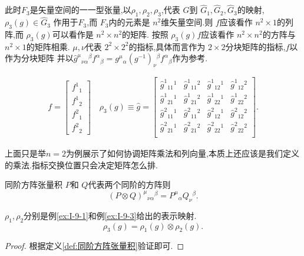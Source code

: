 \documentclass[../main.tex]{subfiles}
\begin{document}
    此时$F_3$是矢量空间的一一型张量,以$\rho_1,\rho_2,\rho_3$,代表 $G$到 $\hat{G}_1,\hat{G}_2,\hat{G}_3$的映射,$\rho_3(g) \in \hat{G}_3$ 作用于$F_3$,而
     $F_3$内的元素是 $n^2$维矢量空间.则 $f$应该看作 $n^2\times 1$的列阵,而 $\rho_3(g)$可以看作是 $n^2 \times n^2$的矩阵.
     按照 $\rho_3(g)f$应该看作 $n^2 \times n^2$的方阵与 $n^2 \times 1$的矩阵相乘.
     $\mu,\nu$代表 $2^2\times 2^2$的指标,具体而言作为 $2\times 2$分块矩阵的指标,$f$以作为分块矩阵
     并以$\hat{g}^{\mu}{}_{\nu \alpha}{}^{\beta} f^{\alpha}{}_{\beta}= g^{\mu}{}_{\alpha}(g^{-1})_{\nu}{}^{\beta} f^{\alpha}{}_{\beta}$作为参考.
      
    \begin{align*}
      f = \begin{bmatrix} f^{1}{}_{1} \\ f^{1}{}_{2}\\f^{2}{}_{1}\\f^{2}{}_{2} \end{bmatrix} 
      \quad \rho_3(g) \equiv \hat{g} = 
      \begin{bmatrix}  
        \hat{g}^{1}{}_{11}{}^1&\hat{g}^{1}{}_{11}{}^2&\hat{g}^{1}{}_{12}{}^1&\hat{g}^{1}{}_{12}{}^2\\
        \hat{g}^{1}{}_{21}{}^1&\hat{g}^{1}{}_{21}{}^2&\hat{g}^{1}{}_{22}{}^1&\hat{g}^{1}{}_{22}{}^2\\
        \hat{g}^{2}{}_{11}{}^1&\hat{g}^{2}{}_{11}{}^2&\hat{g}^{2}{}_{12}{}^1&\hat{g}^{2}{}_{12}{}^2\\
        \hat{g}^{2}{}_{21}{}^1&\hat{g}^{2}{}_{21}{}^2&\hat{g}^{2}{}_{22}{}^1&\hat{g}^{2}{}_{22}{}^2\\
      \end{bmatrix} 
    .\end{align*}
    \begin{note}
      上面只是举$n = 2$为例展示了如何协调矩阵乘法和列向量,本质上还应该是我们定义的乘法.指标交换位置只会决定矩阵怎么排.
    \end{note}
    \begin{definition}
      {}{同阶方阵张量积}
      $P$和 $Q$代表两个同阶的方阵则 \[
        (P \otimes Q)^{\mu}{}_{\nu\alpha}{}^{\beta} = P^{\mu}{}_{\alpha}Q_{\nu}{}^{\beta}
      .\] 
    \end{definition}
    \begin{theorem}
      $\rho_1,\rho_2$分别是例\ref{ex:I-9-1}和例\ref{ex:I-9-3}给出的表示映射.
      \[
      \rho_3(g) = \rho_1(g) \otimes \rho_2(g)
      .\] 
    \end{theorem}
    \begin{proof}
      根据定义\ref{def:同阶方阵张量积}验证即可.
    \end{proof}
\end{document}
